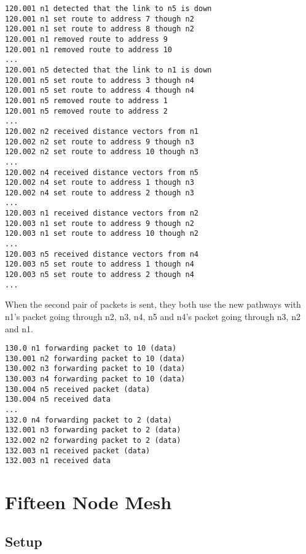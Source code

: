 \documentclass[11pt]{article}
\begin{document}
\begin{lstlisting}
120.001 n1 detected that the link to n5 is down
120.001 n1 set route to address 7 though n2
120.001 n1 set route to address 8 though n2
120.001 n1 removed route to address 9
120.001 n1 removed route to address 10
...
120.001 n5 detected that the link to n1 is down
120.001 n5 set route to address 3 though n4
120.001 n5 set route to address 4 though n4
120.001 n5 removed route to address 1
120.001 n5 removed route to address 2
...
120.002 n2 received distance vectors from n1
120.002 n2 set route to address 9 though n3
120.002 n2 set route to address 10 though n3
...
120.002 n4 received distance vectors from n5
120.002 n4 set route to address 1 though n3
120.002 n4 set route to address 2 though n3
...
120.003 n1 received distance vectors from n2
120.003 n1 set route to address 9 though n2
120.003 n1 set route to address 10 though n2
...
120.003 n5 received distance vectors from n4
120.003 n5 set route to address 1 though n4
120.003 n5 set route to address 2 though n4
...
\end{lstlisting}

\vspace{5mm}

When the second pair of packets is sent, they both use the new pathways with n1's packet going through n2, n3, n4, n5 and n4's packet going through n3, n2 and n1.

\vspace{5mm}

\begin{lstlisting}
130.0 n1 forwarding packet to 10 (data)
130.001 n2 forwarding packet to 10 (data)
130.002 n3 forwarding packet to 10 (data)
130.003 n4 forwarding packet to 10 (data)
130.004 n5 received packet (data)
130.004 n5 received data
...
132.0 n4 forwarding packet to 2 (data)
132.001 n3 forwarding packet to 2 (data)
132.002 n2 forwarding packet to 2 (data)
132.003 n1 received packet (data)
132.003 n1 received data
\end{lstlisting}

\vspace{5mm}

\section{Fifteen Node Mesh}

\subsection{Setup}
\end{document}
